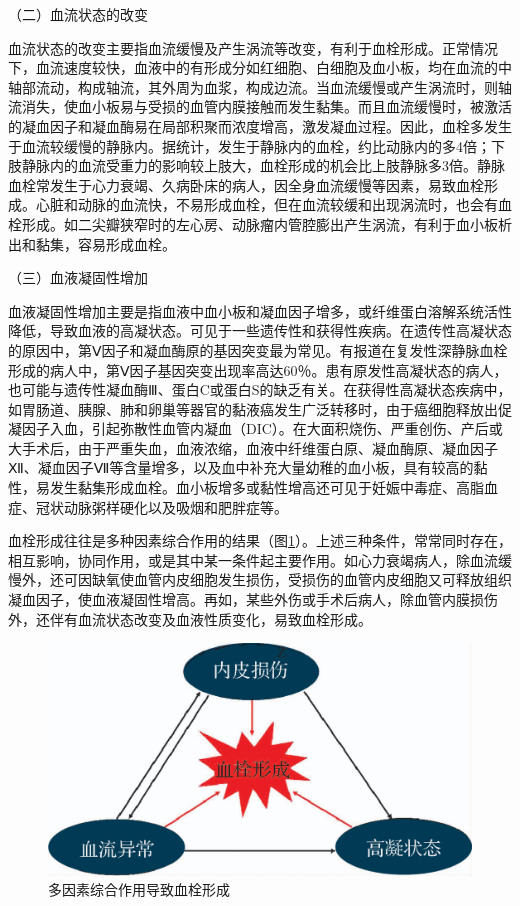 {（二）血流状态的改变}

血流状态的改变主要指血流缓慢及产生涡流等改变，有利于血栓形成。正常情况下，血流速度较快，血液中的有形成分如红细胞、白细胞及血小板，均在血流的中轴部流动，构成轴流，其外周为血浆，构成边流。当血流缓慢或产生涡流时，则轴流消失，使血小板易与受损的血管内膜接触而发生黏集。而且血流缓慢时，被激活的凝血因子和凝血酶易在局部积聚而浓度增高，激发凝血过程。因此，血栓多发生于血流较缓慢的静脉内。据统计，发生于静脉内的血栓，约比动脉内的多4倍；下肢静脉内的血流受重力的影响较上肢大，血栓形成的机会比上肢静脉多3倍。静脉血栓常发生于心力衰竭、久病卧床的病人，因全身血流缓慢等因素，易致血栓形成。心脏和动脉的血流快，不易形成血栓，但在血流较缓和出现涡流时，也会有血栓形成。如二尖瓣狭窄时的左心房、动脉瘤内管腔膨出产生涡流，有利于血小板析出和黏集，容易形成血栓。

{（三）血液凝固性增加}

血液凝固性增加主要是指血液中血小板和凝血因子增多，或纤维蛋白溶解系统活性降低，导致血液的高凝状态。可见于一些遗传性和获得性疾病。在遗传性高凝状态的原因中，第Ⅴ因子和凝血酶原的基因突变最为常见。有报道在复发性深静脉血栓形成的病人中，第Ⅴ因子基因突变出现率高达60％。患有原发性高凝状态的病人，也可能与遗传性凝血酶Ⅲ、蛋白C或蛋白S的缺乏有关。在获得性高凝状态疾病中，如胃肠道、胰腺、肺和卵巢等器官的黏液癌发生广泛转移时，由于癌细胞释放出促凝因子入血，引起弥散性血管内凝血（DIC）。在大面积烧伤、严重创伤、产后或大手术后，由于严重失血，血液浓缩，血液中纤维蛋白原、凝血酶原、凝血因子Ⅻ、凝血因子Ⅶ等含量增多，以及血中补充大量幼稚的血小板，具有较高的黏性，易发生黏集形成血栓。血小板增多或黏性增高还可见于妊娠中毒症、高脂血症、冠状动脉粥样硬化以及吸烟和肥胖症等。

血栓形成往往是多种因素综合作用的结果（图\ref{fig3-5}）。上述三种条件，常常同时存在，相互影响，协同作用，或是其中某一条件起主要作用。如心力衰竭病人，除血流缓慢外，还可因缺氧使血管内皮细胞发生损伤，受损伤的血管内皮细胞又可释放组织凝血因子，使血液凝固性增高。再如，某些外伤或手术后病人，除血管内膜损伤外，还伴有血流状态改变及血液性质变化，易致血栓形成。

\begin{figure}[!htbp]
\centering
\includegraphics{./images/Image00038.jpg}
\caption{多因素综合作用导致血栓形成}
\label{fig3-5} 
\end{figure} 

